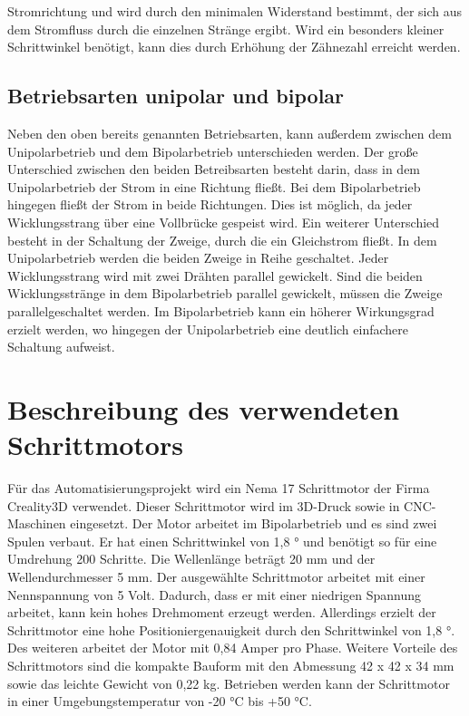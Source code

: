 Stromrichtung und wird durch den minimalen Widerstand bestimmt, der sich aus dem Stromfluss durch die einzelnen Stränge ergibt. Wird ein besonders kleiner Schrittwinkel benötigt, kann dies durch Erhöhung der Zähnezahl erreicht werden. \cite{Schroder.2021} \cite{Hagl.2021} \cite{Babiel.2023}
\subsection{Betriebsarten unipolar und bipolar}
Neben den oben bereits genannten Betriebsarten, kann außerdem zwischen dem Unipolarbetrieb und dem Bipolarbetrieb unterschieden werden. Der große Unterschied zwischen den beiden Betreibsarten besteht darin, dass in dem Unipolarbetrieb der Strom in eine Richtung fließt. Bei dem Bipolarbetrieb hingegen fließt der Strom in beide Richtungen. Dies ist möglich, da jeder Wicklungsstrang über eine Vollbrücke gespeist wird. Ein weiterer Unterschied besteht in der Schaltung der Zweige, durch die ein Gleichstrom fließt. In dem Unipolarbetrieb werden die beiden Zweige in Reihe geschaltet. Jeder Wicklungsstrang wird mit zwei Drähten parallel gewickelt. Sind die beiden Wicklungsstränge in dem Bipolarbetrieb parallel gewickelt, müssen die Zweige parallelgeschaltet werden. Im Bipolarbetrieb kann ein höherer Wirkungsgrad erzielt werden, wo hingegen der Unipolarbetrieb eine deutlich einfachere Schaltung aufweist. \cite{Schroder.2021}
\section{Beschreibung des verwendeten Schrittmotors}
Für das Automatisierungsprojekt wird ein Nema 17 Schrittmotor der Firma Creality3D verwendet. Dieser Schrittmotor wird im 3D-Druck sowie in CNC-Maschinen eingesetzt. Der Motor arbeitet im Bipolarbetrieb und es sind zwei Spulen verbaut. Er hat einen Schrittwinkel von 1,8 ° und benötigt so für eine Umdrehung 200 Schritte. Die Wellenlänge beträgt 20 mm und der Wellendurchmesser 5 mm. Der ausgewählte Schrittmotor arbeitet mit einer Nennspannung von 5 Volt. Dadurch, dass er mit einer niedrigen Spannung arbeitet, kann kein hohes Drehmoment erzeugt werden. Allerdings erzielt der Schrittmotor eine hohe Positioniergenauigkeit durch den Schrittwinkel von 1,8 °. Des weiteren arbeitet der Motor mit 0,84 Amper pro Phase. Weitere Vorteile des Schrittmotors sind die kompakte Bauform mit den Abmessung 42 x 42 x 34 mm sowie das leichte Gewicht von 0,22 kg. Betrieben werden kann der Schrittmotor in einer Umgebungstemperatur von -20 °C bis +50 °C.\cite{Jkongmotor.}
